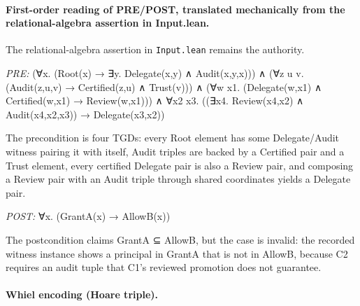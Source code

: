 \documentclass[10pt]{article}
\begin{document}
\paragraph{First-order reading of PRE/POST, translated mechanically from the relational-algebra assertion in Input.lean.} The relational-algebra assertion in \texttt{Input.lean} remains the authority.

\textit{PRE:} (∀x. (Root(x) → ∃y. Delegate(x,y) ∧ Audit(x,y,x))) ∧ (∀z u v. (Audit(z,u,v) → Certified(z,u) ∧ Trust(v))) ∧ (∀w x1. (Delegate(w,x1) ∧ Certified(w,x1) → Review(w,x1))) ∧ ∀x2 x3. ((∃x4. Review(x4,x2) ∧ Audit(x4,x2,x3)) → Delegate(x3,x2))\par The precondition is four TGDs: every Root element has some Delegate/Audit witness pairing it with itself, Audit triples are backed by a Certified pair and a Trust element, every certified Delegate pair is also a Review pair, and composing a Review pair with an Audit triple through shared coordinates yields a Delegate pair.

\textit{POST:} ∀x. (GrantA(x) → AllowB(x))\par The postcondition claims GrantA ⊆ AllowB, but the case is invalid: the recorded witness instance shows a principal in GrantA that is not in AllowB, because C2 requires an audit tuple that C1's reviewed promotion does not guarantee.

\paragraph{Whiel encoding (Hoare triple).}
\end{document}

